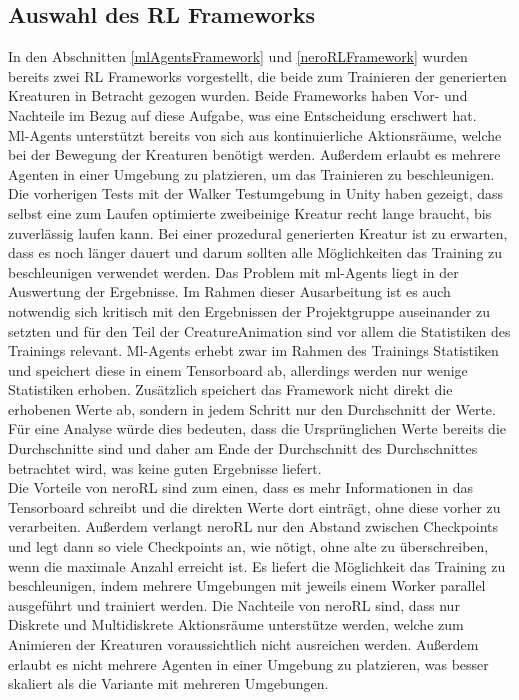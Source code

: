 \subsection{Auswahl des RL Frameworks} \label{RLFrameworks}
In den Abschnitten \ref{mlAgentsFramework} und \ref{neroRLFramework} wurden bereits zwei RL Frameworks vorgestellt, die beide zum Trainieren der generierten Kreaturen in Betracht gezogen wurden. Beide Frameworks haben Vor- und Nachteile im Bezug auf diese Aufgabe, was eine Entscheidung erschwert hat.\\

\noindent Ml-Agents unterstützt bereits von sich aus kontinuierliche Aktionsräume, welche bei der Bewegung der Kreaturen benötigt werden. Außerdem erlaubt es mehrere Agenten in einer Umgebung zu platzieren, um das Trainieren zu beschleunigen. Die vorherigen Tests mit der Walker Testumgebung in Unity \cite{walkerEnv} haben gezeigt, dass selbst eine zum Laufen optimierte zweibeinige Kreatur recht lange braucht, bis zuverlässig laufen kann. Bei einer prozedural generierten Kreatur ist zu erwarten, dass es noch länger dauert und darum sollten alle Möglichkeiten das Training zu beschleunigen verwendet werden. Das Problem mit ml-Agents liegt in der Auswertung der Ergebnisse. Im Rahmen dieser Ausarbeitung ist es auch notwendig sich kritisch mit den Ergebnissen der Projektgruppe auseinander zu setzten und für den Teil der CreatureAnimation sind vor allem die Statistiken des Trainings relevant. Ml-Agents erhebt zwar im Rahmen des Trainings Statistiken und speichert diese in einem Tensorboard ab, allerdings werden nur wenige Statistiken erhoben. Zusätzlich speichert das Framework nicht direkt die erhobenen Werte ab, sondern in jedem Schritt nur den Durchschnitt der Werte. Für eine Analyse würde dies bedeuten, dass die Ursprünglichen Werte bereits die Durchschnitte sind und daher am Ende der Durchschnitt des Durchschnittes betrachtet wird, was keine guten Ergebnisse liefert. \\

\noindent Die Vorteile von neroRL sind zum einen, dass es mehr Informationen in das Tensorboard schreibt und die direkten Werte dort einträgt, ohne diese vorher zu verarbeiten. Außerdem verlangt neroRL nur den Abstand zwischen Checkpoints und legt dann so viele Checkpoints an, wie nötigt, ohne alte zu überschreiben, wenn die maximale Anzahl erreicht ist. Es liefert die Möglichkeit das Training zu beschleunigen, indem mehrere Umgebungen mit jeweils einem Worker parallel ausgeführt und trainiert werden. Die Nachteile von neroRL sind, dass nur Diskrete und Multidiskrete Aktionsräume unterstütze werden, welche zum Animieren der Kreaturen voraussichtlich nicht ausreichen werden. Außerdem erlaubt es nicht mehrere Agenten in einer Umgebung zu platzieren, was besser skaliert als die Variante mit mehreren Umgebungen.\\

